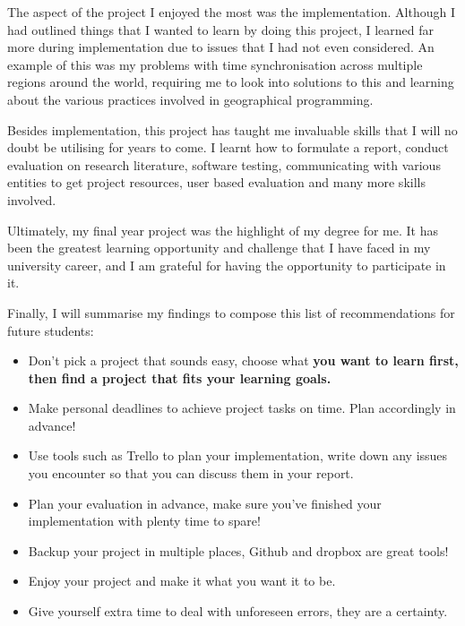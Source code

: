 The aspect of the project I enjoyed the most was the implementation. Although I had outlined things that I wanted to learn by doing this project, I learned far more during implementation due to issues that I had not even considered. An example of this was my problems with time synchronisation across multiple regions around the world, requiring me to look into solutions to this and learning about the various practices involved in geographical programming.

Besides implementation, this project has taught me invaluable skills that I will no doubt be utilising for years to come. I learnt how to formulate a report, conduct evaluation on research literature, software testing, communicating with various entities to get project resources, user based evaluation and many more skills involved.

Ultimately, my final year project was the highlight of my degree for me. It has been the greatest learning opportunity and challenge that I have faced in my university career, and I am grateful for having the opportunity to participate in it.

Finally, I will summarise my findings to compose this list of recommendations for future students:

\begin{itemize}
	\item Don't pick a project that sounds easy, choose what \bf{you} want to learn first, then find a project that fits your learning goals.
	\item Make personal deadlines to achieve project tasks on time. Plan accordingly in advance!
	\item Use tools such as Trello to plan your implementation, write down any issues you encounter so that you can discuss them in your report.
	\item Plan your evaluation in advance, make sure you've finished your implementation with plenty time to spare!
	\item Backup your project in multiple places, Github and dropbox are great tools!
	\item Enjoy your project and make it what you want it to be.
	\item Give yourself extra time to deal with unforeseen errors, they are a certainty.
\end{itemize}

